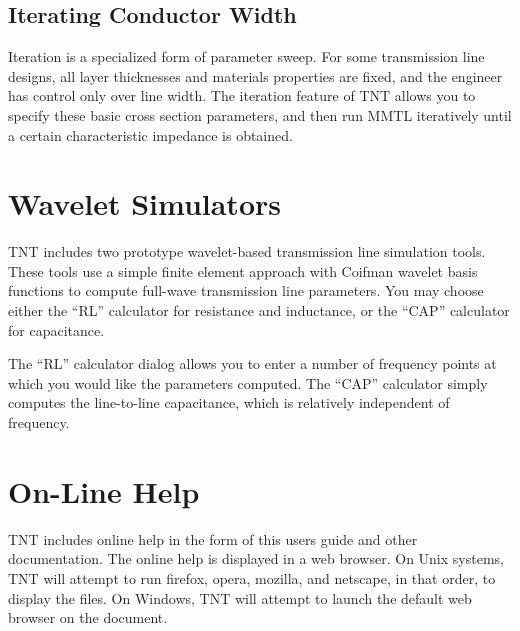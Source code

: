 \documentclass{article}
\begin{document}

\subsection {Iterating Conductor Width}

Iteration is a specialized form of parameter sweep.  For some
transmission line designs, all layer thicknesses and materials
properties are fixed, and the engineer has control only over line
width.  The iteration feature of TNT allows you to specify these basic
cross section parameters, and then run MMTL iteratively until a
certain characteristic impedance is obtained.





\section {Wavelet Simulators}

TNT includes two prototype wavelet-based transmission line simulation
tools.  These tools use a simple finite element approach with Coifman
wavelet basis functions to compute full-wave transmission line
parameters.  You may choose either the ``RL'' calculator for
resistance and inductance, or the ``CAP'' calculator for capacitance.

The ``RL'' calculator dialog allows you to enter a number of frequency
points at which you would like the parameters computed.  The ``CAP''
calculator simply computes the line-to-line capacitance, which is
relatively independent of frequency.




\section {On-Line Help}

TNT includes online help in the form of this users guide and other
documentation.  The online help is displayed in a web browser.  On
Unix systems, TNT will attempt to run firefox, opera, mozilla, and
netscape, in that order, to display the files.  On Windows, TNT will
attempt to launch the default web browser on the document.
\end{document}
